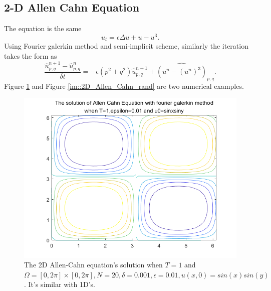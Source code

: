 \documentclass[a4paper]{article}
\begin{document}
\subsection{2-D Allen Cahn Equation}
The equation is the same
\begin{equation}
    u_t = \epsilon \Delta u +u-u^3.
\end{equation}
Using Fourier galerkin method and semi-implicit scheme, similarly the iteration takes the form as 
\begin{equation}
    \frac{\hat{u}_{p,q}^{n+1}-\hat{u}_{p,q}^n}{\delta t}=-\epsilon (p^2+q^2)\hat{u}_{p,q}^{n+1}+\hat{(u^n-(u^n)^3)}_{p,q}.
\end{equation}
Figure \ref{im::2D_Allen_Cahn_sinxsiny} and Figure \ref{im::2D_Allen_Cahn_rand} are two numerical examples.
\begin{figure}[h]
    \centering
    \includegraphics[scale=0.4]{2DAllen_Cahn.png}
    \caption{The 2D Allen-Cahn equation's solution when $T=1$ and $\Omega = [0,2\pi]\times[0,2\pi], N = 20, \delta=0.001, \epsilon=0.01, u(x,0)=sin(x)sin(y)$. It's similar with 1D's.}
    \label{im::2D_Allen_Cahn_sinxsiny}
\end{figure}
\end{document}
